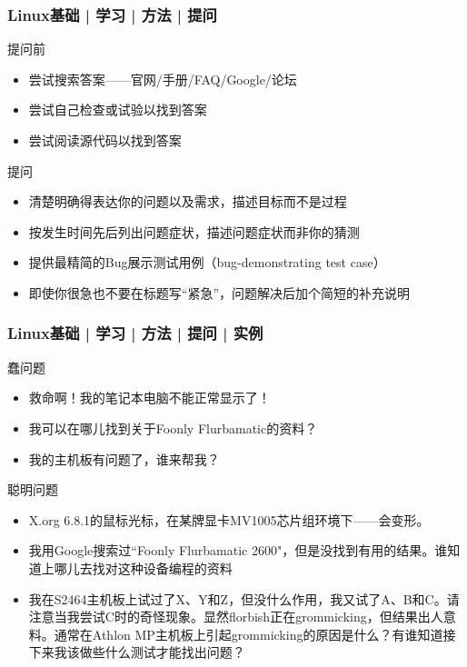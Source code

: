 \begin{frame}
  \frametitle{Linux基础 | 学习 | 方法 | \alert{提问}}
    \begin{block}{提问前}
      \begin{itemize}
        \item 尝试搜索答案——官网/手册/FAQ/Google/论坛
        \item 尝试自己检查或试验以找到答案
        \item 尝试阅读源代码以找到答案
      \end{itemize}
    \end{block}
    \pause
    \begin{block}{提问}
      \begin{itemize}
        \item 清楚明确得表达你的问题以及需求，描述目标而不是过程
        \item 按发生时间先后列出问题症状，描述问题症状而非你的猜测
        \item 提供最精简的Bug展示测试用例（bug-demonstrating test case）
        \item 即使你很急也不要在标题写“紧急”，问题解决后加个简短的补充说明
      \end{itemize}
    \end{block}
\end{frame}

\begin{frame}
  \frametitle{Linux基础 | 学习 | 方法 | 提问 | 实例}
  \begin{block}{蠢问题}
    \begin{itemize}
      \item 救命啊！我的笔记本电脑不能正常显示了！
      \item 我可以在哪儿找到关于Foonly Flurbamatic的资料？
      \item 我的主机板有问题了，谁来帮我？
    \end{itemize}
  \end{block}
  \pause
  \vspace{-0.5em}
  \begin{block}{聪明问题}
    \begin{itemize}
      \item X.org 6.8.1的鼠标光标，在某牌显卡MV1005芯片组环境下——会变形。
      \item 我用Google搜索过``Foonly Flurbamatic 2600"，但是没找到有用的结果。谁知道上哪儿去找对这种设备编程的资料
      \item 我在S2464主机板上试过了X、Y和Z，但没什么作用，我又试了A、B和C。请注意当我尝试C时的奇怪现象。显然florbish正在grommicking，但结果出人意料。通常在Athlon MP主机板上引起grommicking的原因是什么？有谁知道接下来我该做些什么测试才能找出问题？
    \end{itemize}
  \end{block}
\end{frame}

